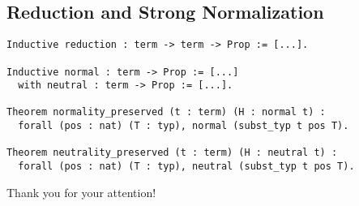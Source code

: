 \documentclass{beamer}
\begin{document}
\subsection{Reduction and Strong Normalization}

\begin{frame}[fragile]

\begin{verbatim}
Inductive reduction : term -> term -> Prop := [...].

Inductive normal : term -> Prop := [...]
  with neutral : term -> Prop := [...].

Theorem normality_preserved (t : term) (H : normal t) :
  forall (pos : nat) (T : typ), normal (subst_typ t pos T).

Theorem neutrality_preserved (t : term) (H : neutral t) :
  forall (pos : nat) (T : typ), neutral (subst_typ t pos T).
\end{verbatim}


\end{frame}



\begin{frame}[fragile]
  \begin{center}
    Thank you for your attention!
  \end{center}
\end{frame}
\end{document}
